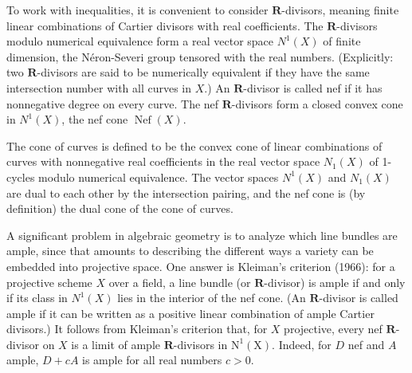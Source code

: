\documentclass[lang=en,12pt]{beautybook}
\begin{document}
To work with inequalities, it is convenient to consider $\mathbf{R}$-divisors, meaning finite linear combinations of Cartier divisors with real coefficients. The $\mathbf{R}$-divisors modulo numerical equivalence form a real vector space $N^1(X)$ of finite dimension, the Néron-Severi group tensored with the real numbers.  (Explicitly: two $\mathbf{R}$-divisors are said to be numerically equivalent if they have the same intersection number with all curves in $X$.) An $\mathbf{R}$-divisor is called nef if it has nonnegative degree on every curve. The nef $\mathbf{R}$-divisors form a closed convex cone in $N^1(X)$, the nef cone $\operatorname{Nef}(X)$.

The cone of curves is defined to be the convex cone of linear combinations of curves with nonnegative real coefficients in the real vector space $N_1(X)$ of 1-cycles modulo numerical equivalence. The vector spaces $N^1(X)$ and $N_1(X)$ are dual to each other by the intersection pairing, and the nef cone is (by definition) the dual cone of the cone of curves.

A significant problem in algebraic geometry is to analyze which line bundles are ample, since that amounts to describing the different ways a variety can be embedded into projective space. One answer is Kleiman's criterion (1966): for a projective scheme $X$ over a field, a line bundle (or $\mathbf{R}$-divisor) is ample if and only if its class in $N^1(X)$ lies in the interior of the nef cone.  (An $\mathbf{R}$-divisor is called ample if it can be written as a positive linear combination of ample Cartier divisors.) It follows from Kleiman's criterion that, for $X$ projective, every nef $\mathbf{R}$-divisor on $X$ is a limit of ample $\mathbf{R}$-divisors in $\mathrm{N}^1(\mathrm{X})$. Indeed, for $D$ nef and $A$ ample, $D+c A$ is ample for all real numbers $c>0$.
\end{document}

